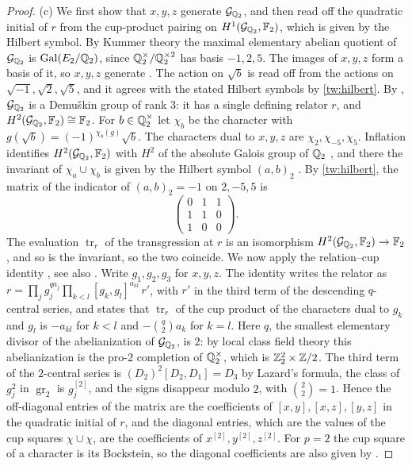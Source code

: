 \begin{proof}
(c) We first show that $x,y,z$ generate $\mathcal G_{\mathbb Q_2}$, and then read
off the quadratic initial of $r$ from the cup-product pairing on
$H^1(\mathcal G_{\mathbb Q_2},\mathbb F_2)$, which is given by the Hilbert symbol.
By Kummer theory the maximal elementary abelian quotient of
$\mathcal G_{\mathbb Q_2}$ is $\operatorname{Gal}(E_2/\mathbb Q_2)$, since $\mathbb Q_2^\times/\mathbb Q_2^{\times2}$
has basis $-1,2,5$. The images of $x,y,z$ form a basis of it, so $x,y,z$
generate \cite[Proposition~3.9.1]{NeukirchSchmidtWingberg2008}. The action on
$\sqrt b$ is read off from the actions on $\sqrt{-1},\sqrt2,\sqrt5$, and it
agrees with the stated Hilbert symbols by \eqref{tw:hilbert}. By
\cite[Theorem~7.5.11]{NeukirchSchmidtWingberg2008}, $\mathcal G_{\mathbb Q_2}$ is a
Demu\v skin group of rank $3$: it has a single defining relator $r$, and
$H^2(\mathcal G_{\mathbb Q_2},\mathbb F_2)\cong\mathbb F_2$. For $b\in\mathbb Q_2^\times$ let $\chi_b$
be the character with $g(\sqrt b)=(-1)^{\chi_b(g)}\sqrt b$. The characters
dual to $x,y,z$ are $\chi_2,\chi_{-5},\chi_5$. Inflation identifies
$H^2(\mathcal G_{\mathbb Q_2},\mathbb F_2)$ with $H^2$ of the absolute Galois group of
$\mathbb Q_2$ \cite[Proposition~7.5.8]{NeukirchSchmidtWingberg2008}, and there the
invariant of $\chi_a\cup\chi_b$ is given by the Hilbert symbol $(a,b)_2$
\cite[Chapter~III, Section~4]{MilneCFT}. By \eqref{tw:hilbert}, the matrix of
the indicator of $(a,b)_2=-1$ on $2,-5,5$ is
\[
 \begin{pmatrix}0&1&1\\1&1&0\\1&0&0\end{pmatrix}.
\]
The evaluation $\operatorname{tr}_r$ of the transgression at $r$ is an
isomorphism $H^2(\mathcal G_{\mathbb Q_2},\mathbb F_2)\to\mathbb F_2$
\cite[Proposition~3.9.12(iii)]{NeukirchSchmidtWingberg2008}, and so is the
invariant, so the two coincide. We now apply the relation--cup identity
\cite[Proposition~3.9.13(ii)]{NeukirchSchmidtWingberg2008}, see also
\cite[Proposition~3.2]{Quadrelli2021}. Write $g_1,g_2,g_3$ for $x,y,z$. The
identity writes the relator as
$r=\prod_jg_j^{qa_j}\prod_{k<l}[g_k,g_l]^{a_{kl}}\,r'$, with $r'$ in the
third term of the descending $q$-central series, and states that
$\operatorname{tr}_r$ of the cup product of the characters dual to $g_k$ and
$g_l$ is $-a_{kl}$ for $k<l$ and $-\binom q2a_k$ for $k=l$. Here $q$, the
smallest elementary divisor of the
abelianization of $\mathcal G_{\mathbb Q_2}$, is $2$: by local class field theory
this abelianization is the pro-$2$ completion of $\mathbb Q_2^\times$, which is
$\mathbb Z_2^2\times\mathbb Z/2$. The third term of the $2$-central series is
$(D_2)^2[D_2,D_1]=D_3$ by Lazard's formula, the class of $g_j^2$ in
$\operatorname{gr}_2$ is $g_j^{[2]}$, and the signs disappear modulo $2$,
with $\binom22=1$. Hence the off-diagonal entries of the matrix are the
coefficients of $[x,y],[x,z],[y,z]$ in the quadratic initial of $r$, and the
diagonal entries, which are the values of the cup squares $\chi\cup\chi$,
are the coefficients of $x^{[2]},y^{[2]},z^{[2]}$. For $p=2$ the cup square
of a character is its Bockstein, so the diagonal coefficients are also given
by \cite[Proposition~3.9.14]{NeukirchSchmidtWingberg2008}.
\end{proof}


